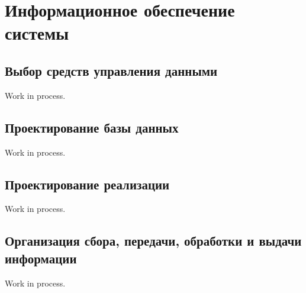 \section{Информационное обеспечение системы}

\subsection{Выбор средств управления данными}

Work in process.

\subsection{Проектирование базы данных}

Work in process.

\subsection{Проектирование реализации}

Work in process.

\subsection{Организация сбора, передачи, обработки и выдачи информации}

Work in process.

\clearpage
\newpage
